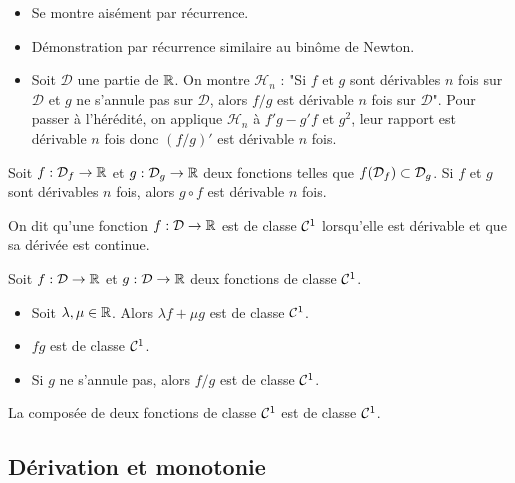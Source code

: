 \documentclass{magnolia}
\begin{document}
\begin{preuve}
\begin{itemize}
\item Se montre aisément par récurrence.
\item Démonstration par récurrence similaire au binôme de Newton.
\item Soit $\mathcal{D}$ une partie de $\mathbb{R}$. On montre $\mathcal{H}_n$ : "Si $f$ et $g$ sont dérivables $n$ fois sur $\mathcal{D}$ et $g$ ne s'annule pas sur $\mathcal{D}$, alors $f/g$ est dérivable $n$ fois sur $\mathcal{D}$".
Pour passer à l'hérédité, on applique $\mathcal{H}_n$ à $f'g-g'f$ et $g^2$, leur rapport est dérivable $n$ fois donc $(f/g)'$ est dérivable $n$ fois.
\end{itemize}
\end{preuve}

\begin{proposition}[utile=-3]
Soit $f:\mathcal{D}_f\to\mathbb{R}$ et $g:\mathcal{D}_g\to\mathbb{R}$ deux fonctions telles que
$f(\mathcal{D}_f)\subset\mathcal{D}_g$. Si $f$ et $g$ sont dérivables $n$ fois, alors $g\circ f$ est
dérivable $n$ fois.  
\end{proposition}

\begin{definition}
On dit qu'une fonction $f:\mathcal{D}\to\mathbb{R}$ est de classe $\mathcal{C}^{1}$ lorsqu'elle est
dérivable et que sa dérivée est continue.
\end{definition}

\begin{proposition}[utile=-3]
Soit $f:\mathcal{D}\to\mathbb{R}$ et $g:\mathcal{D}\to\mathbb{R}$ deux fonctions de classe $\mathcal{C}^{1}$.
\begin{itemize}
\item Soit $\lambda,\mu\in\mathbb{R}$. Alors $\lambda f+\mu g$ est de classe $\mathcal{C}^{1}$.
\item $fg$ est de classe $\mathcal{C}^{1}$.
\item Si $g$ ne s'annule pas, alors $f/g$ est de classe $\mathcal{C}^{1}$.
\end{itemize}
\end{proposition}

\begin{proposition}[utile=-3]
La composée de deux fonctions de classe $\mathcal{C}^{1}$ est de classe $\mathcal{C}^{1}$.
\end{proposition}

\subsection{Dérivation et monotonie}
\end{document}

